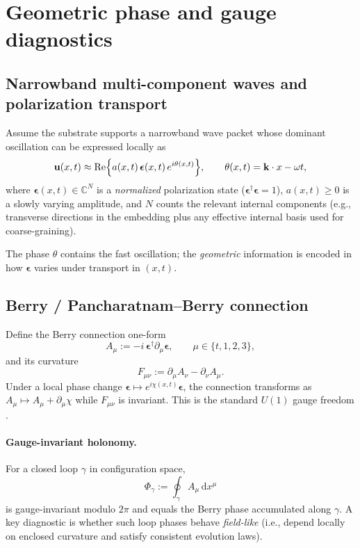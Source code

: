\section{Geometric phase and gauge diagnostics}
\label{sec:geophase}

\subsection{Narrowband multi-component waves and polarization transport}

Assume the substrate supports a narrowband wave packet whose dominant oscillation can be expressed
locally as
\begin{equation}
  \mathbf{u}(x,t) \approx \mathrm{Re}\Big\{ a(x,t)\,\bm{\epsilon}(x,t)\,e^{i\theta(x,t)} \Big\},
  \qquad
  \theta(x,t)=\mathbf{k}\cdot x-\omega t,
  \label{eq:quasi-monochromatic}
\end{equation}
where $\bm{\epsilon}(x,t)\in\mathbb{C}^N$ is a \emph{normalized} polarization state ($\bm{\epsilon}^\dagger\bm{\epsilon}=1$),
$a(x,t)\ge 0$ is a slowly varying amplitude, and $N$ counts the relevant internal components
(e.g., transverse directions in the embedding plus any effective internal basis used for coarse-graining).

The phase $\theta$ contains the fast oscillation; the \emph{geometric} information is encoded in how
$\bm{\epsilon}$ varies under transport in $(x,t)$.

\subsection{Berry / Pancharatnam--Berry connection}

Define the Berry connection one-form
\begin{equation}
  A_\mu := -i\,\bm{\epsilon}^\dagger \partial_\mu \bm{\epsilon},
  \qquad \mu\in\{t,1,2,3\},
  \label{eq:berry-connection}
\end{equation}
and its curvature
\begin{equation}
  F_{\mu\nu} := \partial_\mu A_\nu - \partial_\nu A_\mu.
  \label{eq:berry-curvature}
\end{equation}
Under a local phase change $\bm{\epsilon}\mapsto e^{i\chi(x,t)}\bm{\epsilon}$,
the connection transforms as $A_\mu\mapsto A_\mu+\partial_\mu \chi$ while $F_{\mu\nu}$ is invariant.
This is the standard $U(1)$ gauge freedom \citep{Berry1984,Pancharatnam1956,Cisowski2022}.

\paragraph{Gauge-invariant holonomy.}
For a closed loop $\gamma$ in configuration space,
\begin{equation}
  \Phi_\gamma := \oint_\gamma A_\mu\,\mathrm{d}x^\mu
\end{equation}
is gauge-invariant modulo $2\pi$ and equals the Berry phase accumulated along $\gamma$.
A key diagnostic is whether such loop phases behave \emph{field-like} (i.e., depend locally
on enclosed curvature and satisfy consistent evolution laws).

